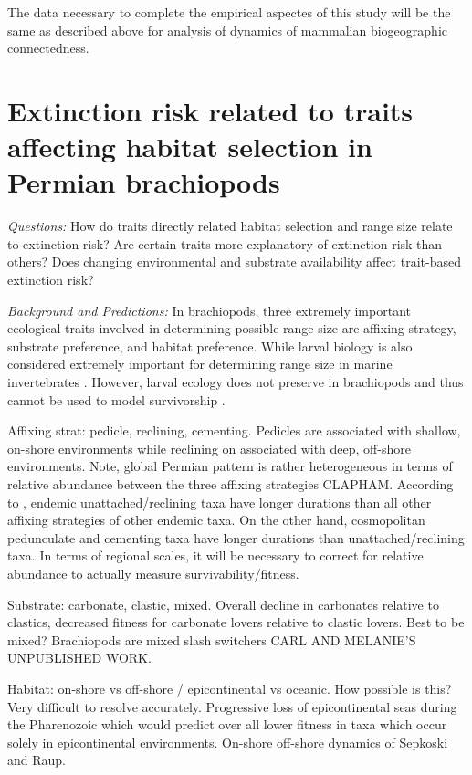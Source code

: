 \documentclass[12pt,letterpaper]{article}
\begin{document}
The data necessary to complete the empirical aspectes of this study will be the same as described above for analysis of dynamics of mammalian biogeographic connectedness.


\section{Extinction risk related to traits affecting habitat selection in Permian brachiopods}

\textit{Questions:} How do traits directly related habitat selection and range size relate to extinction risk? Are certain traits more explanatory of extinction risk than others? Does changing environmental and substrate availability affect trait-based extinction risk?

\textit{Background and Predictions:}
In brachiopods, three extremely important ecological traits involved in determining possible range size are affixing strategy, substrate preference, and habitat preference. While larval biology is also considered extremely important for determining range size in marine invertebrates \citep{Jablonski2006a,Jablonski1983}. However, larval ecology does not preserve in brachiopods and thus cannot be used to model survivorship \citep{Jablonski1983}.

Affixing strat: pedicle, reclining, cementing. Pedicles are associated with shallow, on-shore environments while reclining on associated with deep, off-shore environments. Note, global Permian pattern is rather heterogeneous in terms of relative abundance between the three affixing strategies CLAPHAM. According to \citet{Alexander1977}, endemic unattached/reclining taxa have longer durations than all other affixing strategies of other endemic taxa. On the other hand, cosmopolitan pedunculate and cementing taxa have longer durations than unattached/reclining taxa. In terms of regional scales, it will be necessary to correct for relative abundance to actually measure survivability/fitness.

Substrate: carbonate, clastic, mixed. Overall decline in carbonates relative to clastics, decreased fitness for carbonate lovers relative to clastic lovers. Best to be mixed? Brachiopods are mixed slash switchers CARL AND MELANIE'S UNPUBLISHED WORK.

Habitat: on-shore vs off-shore / epicontinental vs oceanic. How possible is this? Very difficult to resolve accurately. Progressive loss of epicontinental seas during the Pharenozoic which would predict over all lower fitness in taxa which occur solely in epicontinental environments. On-shore off-shore dynamics of Sepkoski and Raup.
\end{document}
